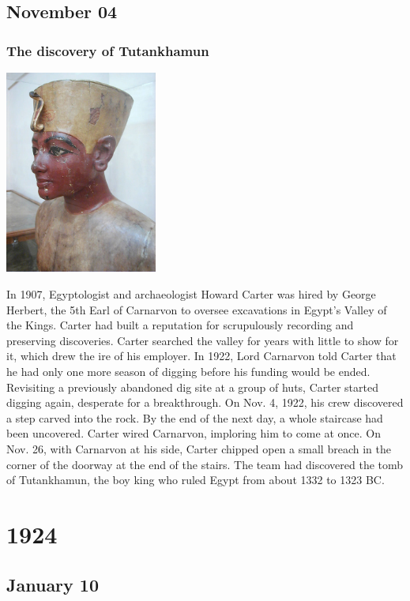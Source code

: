 \documentclass[11pt]{report}
\begin{document}
\section{November 04}
\subsection{The discovery of Tutankhamun}
\vspace{2mm}\begin{center}\includegraphics[width=5cm]{./img/tutankhamon.jpg}\end{center}
In 1907, Egyptologist and archaeologist Howard Carter was hired by George Herbert, the 5th Earl of Carnarvon to oversee excavations in Egypt’s Valley of the Kings. Carter had built a reputation for scrupulously recording and preserving discoveries.
Carter searched the valley for years with little to show for it, which drew the ire of his employer. In 1922, Lord Carnarvon told Carter that he had only one more season of digging before his funding would be ended.\\
\indent Revisiting a previously abandoned dig site at a group of huts, Carter started digging again, desperate for a breakthrough.
On Nov. 4, 1922, his crew discovered a step carved into the rock. By the end of the next day, a whole staircase had been uncovered. Carter wired Carnarvon, imploring him to come at once.
On Nov. 26, with Carnarvon at his side, Carter chipped open a small breach in the corner of the doorway at the end of the stairs.
The team had discovered the tomb of Tutankhamun, the boy king who ruled Egypt from about 1332 to 1323 BC.

\chapter{1924}
\section{January 10}
\end{document}
